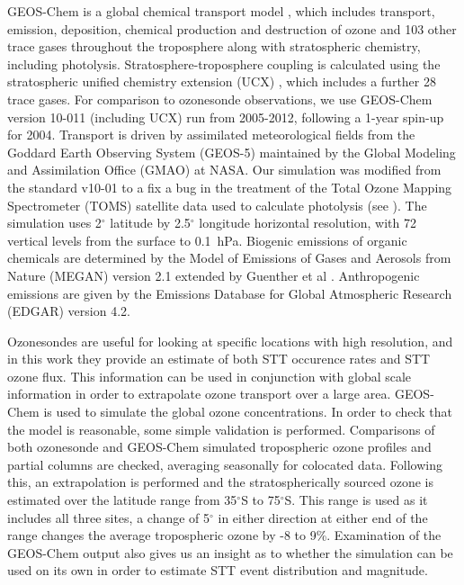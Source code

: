 \documentclass{article}
\begin{document}
  GEOS-Chem is a global chemical transport model \citep{Bey2001}, which includes transport, emission, deposition, chemical production and destruction of ozone and 103 other trace gases throughout the troposphere along with stratospheric chemistry, including photolysis. 
  Stratosphere-troposphere coupling is calculated using the stratospheric unified chemistry extension (UCX) \citep{Eastham2014}, which includes a further 28 trace gases.
  For comparison to ozonesonde observations, we use GEOS-Chem version 10-011 (including UCX) run from 2005-2012, following a 1-year spin-up for 2004.
  Transport is driven by assimilated meteorological fields from the Goddard Earth Observing System (GEOS-5) maintained by the Global Modeling and Assimilation Office (GMAO) at NASA.
  Our simulation was modified from the standard v10-01 to a fix a bug in the treatment of the Total Ozone Mapping Spectrometer (TOMS) satellite data used to calculate photolysis (see \citet{TomsFix2016}).
  The simulation uses 2$^{\circ}$ latitude by 2.5$^{\circ}$ longitude horizontal resolution, with 72 vertical levels from the surface to 0.1~hPa.
  Biogenic emissions of organic chemicals are determined by the Model of Emissions of Gases and Aerosols from Nature (MEGAN) version 2.1 extended by Guenther et al \citep{Guenther2012}.
  Anthropogenic emissions are given by the Emissions Database for Global Atmospheric Research (EDGAR) version 4.2.
  
  Ozonesondes are useful for looking at specific locations with high resolution, and in this work they provide an estimate of both STT occurence rates and STT ozone flux.
  This information can be used in conjunction with global scale information in order to extrapolate ozone transport over a large area.
  GEOS-Chem is used to simulate the global ozone concentrations.
  In order to check that the model is reasonable, some simple validation is performed.
  Comparisons of both ozonesonde and GEOS-Chem simulated tropospheric ozone profiles and partial columns are checked, averaging seasonally for colocated data.
  Following this, an extrapolation is performed and the stratospherically sourced ozone is estimated over the latitude range from 35$^{\circ}$S to 75$^{\circ}$S.
  This range is used as it includes all three sites, a change of 5$^{\circ}$ in either direction at either end of the range changes the average tropospheric ozone by -8 to 9\%.
  Examination of the GEOS-Chem output also gives us an insight as to whether the simulation can be used on its own in order to estimate STT event distribution and magnitude.
  
\end{document}
